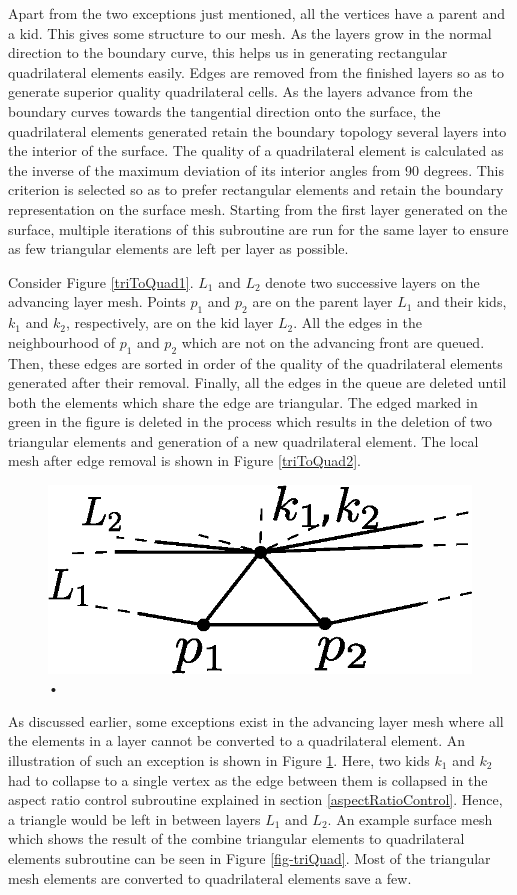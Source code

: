 Apart from the two exceptions just mentioned, all the vertices have a parent and a kid. This gives some structure to our mesh. As the layers grow in the normal direction to the boundary curve, this helps us in generating rectangular quadrilateral elements easily. Edges are removed from the finished layers so as to generate superior quality quadrilateral cells. As the layers advance from the boundary curves towards the tangential direction onto the surface, the quadrilateral elements generated retain the boundary topology several layers into the interior of the surface. The quality of a quadrilateral element is calculated as the inverse of the maximum deviation of its interior angles from 90 degrees. This criterion is selected so as to prefer rectangular elements and retain the boundary representation on the surface mesh. Starting from the first layer generated on the surface, multiple iterations of this subroutine are run for the same layer to ensure as few triangular elements are left per layer as possible.

Consider Figure \ref{triToQuad1}. $L_1$ and $L_2$ denote two successive layers on the advancing layer mesh. Points $p_1$ and $p_2$ are on the parent layer $L_1$ and their kids, $k_1$ and $k_2$, respectively, are on the kid layer $L_2$. All the edges in the neighbourhood of $p_1$ and $p_2$ which are not on the advancing front are queued. Then, these edges are sorted in order of the quality of the quadrilateral elements generated after their removal. Finally, all the edges in the queue are deleted until both the elements which share the edge are triangular. The edged marked in green in the figure is deleted in the process which results in the deletion of two triangular elements and generation of a new quadrilateral element. The local mesh after edge removal is shown in Figure \ref{triToQuad2}.

\vspace{10pt}
\begin{figure}[hbt!]
  \centering
  \includegraphics[width=0.5\linewidth]{img/m2/combineTriToQuad3.eps}
  \caption{•}
  \label{triLeft}
\end{figure}

As discussed earlier, some exceptions exist in the advancing layer mesh where all the elements in a layer cannot be converted to a quadrilateral element. An illustration of such an exception is shown in Figure \ref{triLeft}. Here, two kids $k_1$ and $k_2$ had to collapse to a single vertex as the edge between them is collapsed in the aspect ratio control subroutine explained in section \ref{aspectRatioControl}. Hence, a triangle would be left in between layers $L_1$ and $L_2$. An example surface mesh which shows the result of the combine triangular elements to quadrilateral elements subroutine can be seen in Figure \ref{fig-triQuad}. Most of the triangular mesh elements are converted to quadrilateral elements save a few.

